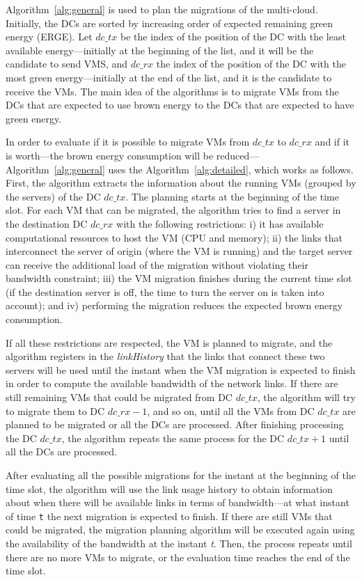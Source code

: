 Algorithm~\ref{alg:general} is used to plan the migrations of the multi-cloud. Initially, the DCs are sorted by increasing order of expected remaining green energy (ERGE). Let $dc\_tx$  be the index of the position of the DC with the least available energy---initially at the beginning of the list, and it will be the candidate to send VMS, and $dc\_rx$ the index of the position of the DC with the most green energy---initially at the end of the list, and it is the candidate to receive the VMs. The main idea of the algorithms is to migrate VMs from the DCs that are expected to use brown energy to the DCs that are expected to have green energy. 

In order to evaluate if it is possible to migrate VMs from $dc\_tx$ to $dc\_rx$ and if it is worth---the brown energy consumption will be reduced---Algorithm~\ref{alg:general} uses the Algorithm~\ref{alg:detailed}, which works as follows. 
First, the algorithm extracts the information about the running VMs (grouped by the servers) of the DC $dc\_tx$. The planning starts at the beginning of the time slot. For each VM that can be migrated, the algorithm tries to find a server in the destination DC $dc\_rx$ with the following restrictions: i) it has available computational resources to host the VM (CPU and memory); ii) the links that interconnect the server of origin (where the VM is running) and the target server can receive the additional load of the migration without violating their bandwidth constraint; iii) the VM migration finishes during the current time slot (if the destination server is off, the time to turn the server on is taken into account); and iv) performing the migration reduces the expected brown energy consumption. 

If all these restrictions are respected, the VM is planned to migrate, and the algorithm registers in the \textit{linkHistory} that the links that connect these two servers will be used until the instant when the VM migration is expected to finish in order to compute the available bandwidth of the network links.  If there are still remaining VMs that could be migrated from DC $dc\_tx$, the algorithm will try to migrate them to DC $dc\_rx -1 $, and so on, until all the VMs from DC $dc\_tx$ are planned to be migrated or all the DCs are processed. After finishing processing the DC $dc\_tx$, the algorithm repeats the same process for the DC $dc\_tx +1$ until all the DCs are processed.

After evaluating all the possible migrations for the instant at the beginning of the time slot, the algorithm will use the link usage history to obtain information about when there will be available links in terms of bandwidth---at what instant of time \texttt{t} the next migration is expected to finish.  If there are still VMs that could be migrated, the migration planning algorithm will be executed again using the availability of the bandwidth at the instant \textit{t}. Then, the process repeats until there are no more VMs to migrate, or the evaluation time reaches the end of the time slot.

